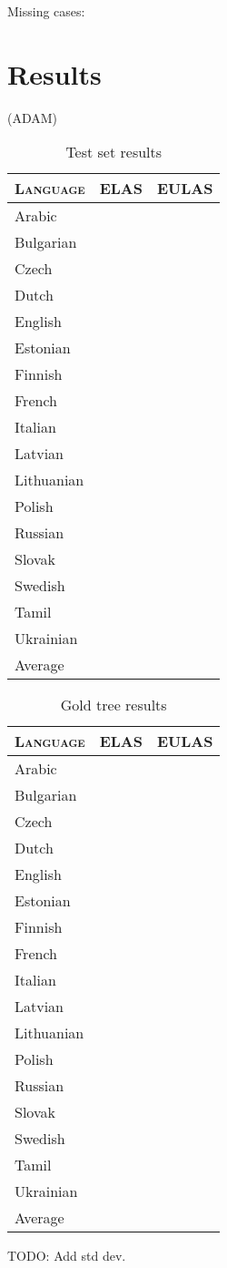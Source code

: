 \documentclass[11pt,a4paper]{article}
\begin{document}
Missing cases:


\section{Results}
(ADAM)

\begin{table}[h]
	\centering
	\begin{tabular}{l|rr}
		\textsc{Language} & \textsc{ELAS} & \textsc{EULAS} \\
		\hline
		Arabic &  & \\
		Bulgarian &  & \\
		Czech &  & \\
		Dutch &  & \\
		English &  & \\
		Estonian &  & \\
		Finnish &  & \\
		French &  & \\
		Italian &  & \\
		Latvian &  & \\
		Lithuanian &  & \\
		Polish &  & \\
		Russian &  & \\
		Slovak &  & \\
		Swedish &  & \\
		Tamil &  & \\
		Ukrainian &  & \\
		Average &  & \\
	\end{tabular}
\caption{Test set results}
\end{table}

\begin{table}[h]
	\centering
	\begin{tabular}{l|rr}
		\textsc{Language} & \textsc{ELAS} & \textsc{EULAS} \\
		\hline 
		Arabic &  & \\
		Bulgarian &  & \\
		Czech &  & \\
		Dutch &  & \\
		English &  & \\
		Estonian &  & \\
		Finnish &  & \\
		French &  & \\
		Italian &  & \\
		Latvian &  & \\
		Lithuanian &  & \\
		Polish &  & \\
		Russian &  & \\
		Slovak &  & \\
		Swedish &  & \\
		Tamil &  & \\
		Ukrainian &  & \\
		Average &  & \\ 
	\end{tabular}
	\caption{Gold tree results}
\end{table} 
TODO: Add std dev.
\end{document}
